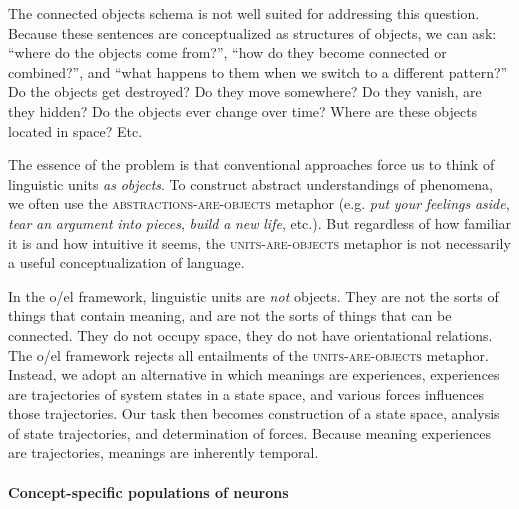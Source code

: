   The connected objects schema is not well suited for addressing this question. Because these sentences are conceptualized as structures of objects, we can ask: “where do the objects come from?”, “how do they become connected or combined?”, and “what happens to them when we switch to a different pattern?” Do the objects get destroyed? Do they move somewhere? Do they vanish, are they hidden? Do the objects ever change over time? Where are these objects located in space? Etc.

  The essence of the problem is that conventional approaches force us to think of linguistic units \textit{as} \textit{objects}. To construct abstract understandings of phenomena, we often use the \textsc{abstractions-}\textsc{are}\textsc{{}-objects} metaphor (e.g. \textit{put} \textit{your} \textit{feelings} \textit{aside}, \textit{tear} \textit{an} \textit{argument} \textit{into} \textit{pieces}, \textit{build} \textit{a} \textit{new} \textit{life}, etc.). But regardless of how familiar it is and how intuitive it seems, the \textsc{units}\textsc{{}-are-}\textsc{objects} metaphor is not necessarily a useful conceptualization of language. 

  In the o/el framework, linguistic units are \textit{not} objects. They are not the sorts of things that contain meaning, and are not the sorts of things that can be connected. They do not occupy space, they do not have orientational relations. The o/el framework rejects all entailments of the \textsc{units}\textsc{{}-are-}\textsc{objects} metaphor. Instead, we adopt an alternative in which meanings are experiences, experiences are trajectories of system states in a state space, and various forces influences those trajectories. Our task then becomes construction of a state space, analysis of state trajectories, and determination of forces. Because meaning experiences are trajectories, meanings are inherently temporal. 

\paragraph{Concept-specific populations of neurons}

